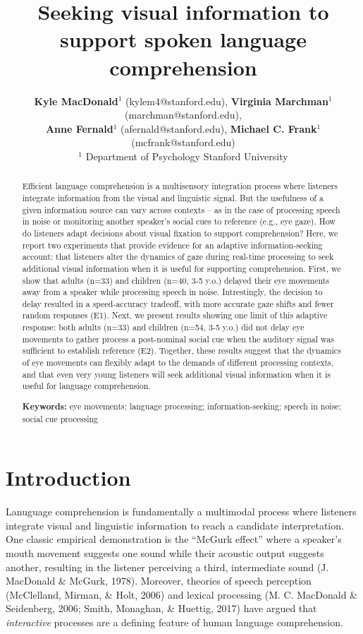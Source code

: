 \documentclass[10pt, letterpaper]{article}
\title{Seeking visual information to support spoken language comprehension}
\author{ {\large \bf Kyle MacDonald}$^1$ (kylem4@stanford.edu), {\large \bf Virginia Marchman}$^1$ (marchman@stanford.edu),  \\ {\large \bf Anne Fernald}$^1$ (afernald@stanford.edu), {\large \bf Michael C. Frank}$^1$ (mcfrank@stanford.edu) 
  \\ $^1$ Department of Psychology Stanford University}
\begin{document}
\maketitle

\begin{abstract}
Efficient language comprehension is a multisensory integration process
where listeners integrate information from the visual and linguistic
signal. But the usefulness of a given information source can vary across
contexts -- as in the case of processing speech in noise or monitoring
another speaker's social cues to reference (e.g., eye gaze). How do
listeners adapt decisions about visual fixation to support
comprehension? Here, we report two experiments that provide evidence for
an adaptive information-seeking account: that listeners alter the
dynamics of gaze during real-time processing to seek additional visual
information when it is useful for supporting comprehension. First, we
show that adults (n=33) and children (n=40, 3-5 y.o.) delayed their eye
movements away from a speaker while processing speech in noise.
Intrestingly, the decision to delay resulted in a speed-accuracy
tradeoff, with more accurate gaze shifts and fewer random responses
(E1). Next, we present results showing one limit of this adaptive
response: both adults (n=33) and children (n=54, 3-5 y.o.) did not delay
eye movements to gather process a post-nominal social cue when the
auditory signal was sufficient to establish reference (E2). Together,
these results suggest that the dynamics of eye movements can flexibly
adapt to the demands of different processing contexts, and that even
very young listeners will seek additional visual information when it is
useful for language comprehension.

\textbf{Keywords:}
eye movements; language processing; information-seeking; speech in
noise; social cue processing
\end{abstract}

\section{Introduction}\label{introduction}

Lanuguage comprehension is fundamentally a multimodal process where
listeners integrate visual and linguistic information to reach a
candidate interpretation. One classic empirical demonstration is the
``McGurk effect'' where a speaker's mouth movement suggests one sound
while their acoustic output suggests another, resulting in the listener
perceiving a third, intermediate sound (J. MacDonald \& McGurk, 1978).
Moreover, theories of speech perception (McClelland, Mirman, \& Holt,
2006) and lexical processing (M. C. MacDonald \& Seidenberg, 2006;
Smith, Monaghan, \& Huettig, 2017) have argued that \emph{interactive}
processes are a defining feature of human language comprehension.
\end{document}
